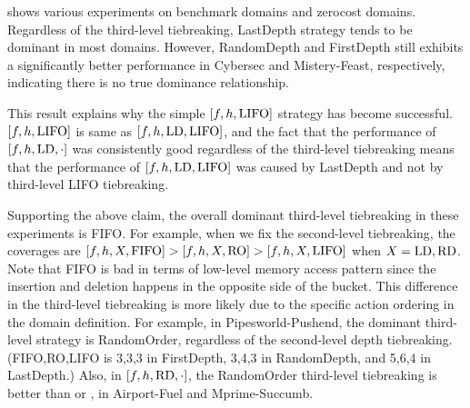  shows various experiments on benchmark domains and
zerocost domains. Regardless of the third-level tiebreaking, LastDepth
strategy tends to be dominant in most domains. However, RandomDepth and
FirstDepth still exhibits a significantly better performance in Cybersec
and Mistery-Feast, respectively, indicating there is no true dominance relationship.

This result explains why the simple $[f,h,\mbox{LIFO}]$ strategy has become
successful. $[f,h,\mbox{LIFO}]$ is same as $[f,h,\mbox{LD},\mbox{LIFO}]$, and the fact
that the performance of $[f,h,\mbox{LD},\cdot]$ was consistently good
regardless of the third-level tiebreaking means that the performance of
$[f,h,\mbox{LD},\mbox{LIFO}]$ was caused by LastDepth and not by third-level LIFO tiebreaking.

Supporting the above claim, the overall dominant third-level tiebreaking
in these experiments is FIFO.  For example, when we fix the second-level
tiebreaking, the coverages are $[f,h,X,\mbox{FIFO}]>[f,h,X,\mbox{RO}]>[f,h,X,\mbox{LIFO}]$
when $X=\mbox{LD},\mbox{RD}$.  Note that FIFO is bad in terms of low-level memory
access pattern since the insertion and deletion happens in the opposite
side of the bucket.  This difference in the third-level tiebreaking is
more likely due to the specific action ordering in the domain
definition.  For example, in Pipesworld-Pushend, the dominant
third-level strategy is RandomOrder, regardless of the second-level
depth tiebreaking.  (FIFO,RO,LIFO is 3,3,3 in FirstDepth, 3,4,3 in
RandomDepth, and 5,6,4 in LastDepth.) Also, in $[f,h,\mbox{RD},\cdot]$, the
RandomOrder third-level tiebreaking is better than \lifo or \fifo, in
Airport-Fuel and Mprime-Succumb.


% 

